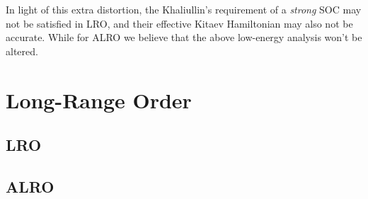 \documentclass[10pt,nofootinbib,letterpaper]{revtex4}
\begin{document}
		In light of this extra distortion, the Khaliullin's requirement of a \emph{strong} SOC may not be satisfied in LRO, and their effective Kitaev Hamiltonian may also not be accurate. While for ALRO we believe that the above low-energy analysis won't be altered.\par


\section{Long-Range Order}
	\subsection{LRO}
	\subsection{ALRO}


\end{document}
